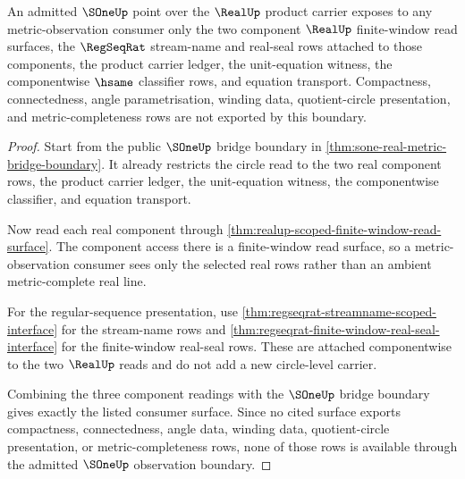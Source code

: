\begin{theorem}
\label{thm:sone-regseqrat-metric-observation-boundary}
An admitted $\SOneUp$ point over the $\RealUp$ product carrier exposes to any
metric-observation consumer only the two component $\RealUp$ finite-window read
surfaces, the $\RegSeqRat$ stream-name and real-seal rows attached to those
components, the product carrier ledger, the unit-equation witness, the
componentwise $\hsame$ classifier rows, and equation transport. Compactness,
connectedness, angle parametrisation, winding data, quotient-circle
presentation, and metric-completeness rows are not exported by this boundary.
\end{theorem}
\begin{proof}
Start from the public $\SOneUp$ bridge boundary in
\autoref{thm:sone-real-metric-bridge-boundary}. It already restricts the circle
read to the two real component rows, the product carrier ledger, the
unit-equation witness, the componentwise classifier, and equation transport.

Now read each real component through
\autoref{thm:realup-scoped-finite-window-read-surface}. The component access
there is a finite-window read surface, so a metric-observation consumer sees
only the selected real rows rather than an ambient metric-complete real line.

For the regular-sequence presentation, use
\autoref{thm:regseqrat-streamname-scoped-interface} for the stream-name rows and
\autoref{thm:regseqrat-finite-window-real-seal-interface} for the finite-window
real-seal rows. These are attached componentwise to the two $\RealUp$ reads and
do not add a new circle-level carrier.

Combining the three component readings with the $\SOneUp$ bridge boundary gives
exactly the listed consumer surface. Since no cited surface exports compactness,
connectedness, angle data, winding data, quotient-circle presentation, or
metric-completeness rows, none of those rows is available through the admitted
$\SOneUp$ observation boundary.
\end{proof}


